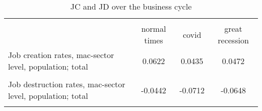 \begin{table}[htbp]\centering
\caption{JC and JD over the business cycle}
\begin{tabular}{l*{3}{c}}
\hline\hline
                    &\multicolumn{3}{c}{}                  \\
                    &normal times&       covid&great recession\\
\hline
Job creation rates, mac-sector level, population; total&      0.0622&      0.0435&      0.0472\\
                    &            &            &            \\
[1em]
Job destruction rates, mac-sector level, population; total&     -0.0442&     -0.0712&     -0.0648\\
                    &            &            &            \\
\hline\hline
\end{tabular}
\end{table}
